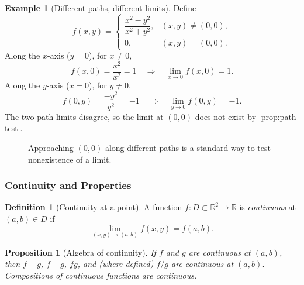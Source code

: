 \documentclass[12pt]{article}
\numberwithin{equation}{section}
\newcommand{\RR}{\mathbb{R}}
\theoremstyle{plain}
\newtheorem{proposition}[theorem]{Proposition}
\theoremstyle{definition}
\newtheorem{definition}[theorem]{Definition}
\newtheorem{example}[theorem]{Example}
\theoremstyle{remark}
\begin{document}
\begin{example}[Different paths, different limits]
Define
\[
f(x,y)=
\begin{cases}
\dfrac{x^2-y^2}{x^2+y^2}, & (x,y)\neq(0,0),\\[6pt]
0, & (x,y)=(0,0).
\end{cases}
\]
Along the $x$-axis ($y=0$), for $x\neq 0$,
\[
f(x,0)=\frac{x^2}{x^2}=1 \quad\Longrightarrow\quad \lim_{x\to 0} f(x,0)=1.
\]
Along the $y$-axis ($x=0$), for $y\neq 0$,
\[
f(0,y)=\frac{-y^2}{y^2}=-1 \quad\Longrightarrow\quad \lim_{y\to 0} f(0,y)=-1.
\]
The two path limits disagree, so the limit at $(0,0)$ does not exist by \cref{prop:path-test}.
\end{example}

\begin{figure}[H]
\centering
{}
\caption{Approaching $(0,0)$ along different paths is a standard way to test nonexistence of a limit.}
\label{fig:paths}
\end{figure}

\subsubsection{Continuity and Properties}

\begin{definition}[Continuity at a point]\label{def:cont-multi}
A function $f:D\subset\RR^2\to\RR$ is \emph{continuous} at $(a,b)\in D$ if
\[
\lim_{(x,y)\to(a,b)} f(x,y)=f(a,b).
\]
\end{definition}

\begin{proposition}[Algebra of continuity]
If $f$ and $g$ are continuous at $(a,b)$, then $f+g$, $f-g$, $fg$, and (where defined) $f/g$ are continuous at $(a,b)$. Compositions of continuous functions are continuous.
\end{proposition}
\end{document}
